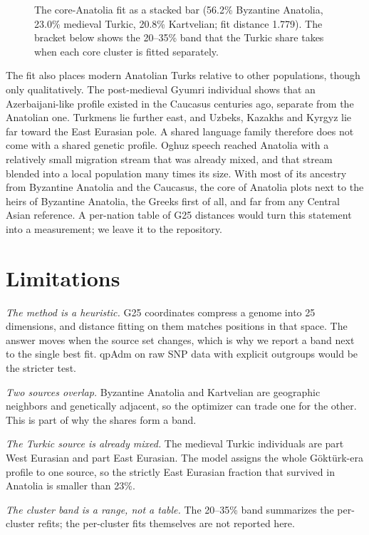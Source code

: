 \documentclass[conference,a4paper]{IEEEtran}
\begin{document}
\begin{figure}[t]
\centering

\caption{The core-Anatolia fit as a stacked bar (56.2\% Byzantine Anatolia, 23.0\% medieval Turkic, 20.8\% Kartvelian; fit distance 1.779). The bracket below shows the 20--35\% band that the Turkic share takes when each core cluster is fitted separately.}
\label{fig:model}
\end{figure}

The fit also places modern Anatolian Turks relative to other populations, though only qualitatively. The post-medieval Gyumri individual shows that an Azerbaijani-like profile existed in the Caucasus centuries ago, separate from the Anatolian one. Turkmens lie further east, and Uzbeks, Kazakhs and Kyrgyz lie far toward the East Eurasian pole. A shared language family therefore does not come with a shared genetic profile. Oghuz speech reached Anatolia with a relatively small migration stream that was already mixed, and that stream blended into a local population many times its size. With most of its ancestry from Byzantine Anatolia and the Caucasus, the core of Anatolia plots next to the heirs of Byzantine Anatolia, the Greeks first of all, and far from any Central Asian reference. A per-nation table of G25 distances would turn this statement into a measurement; we leave it to the repository.

\section{Limitations}\label{sec:limits}
\textit{The method is a heuristic.} G25 coordinates compress a genome into 25 dimensions, and distance fitting on them matches positions in that space. The answer moves when the source set changes, which is why we report a band next to the single best fit. qpAdm on raw SNP data with explicit outgroups would be the stricter test.

\textit{Two sources overlap.} Byzantine Anatolia and Kartvelian are geographic neighbors and genetically adjacent, so the optimizer can trade one for the other. This is part of why the shares form a band.

\textit{The Turkic source is already mixed.} The medieval Turkic individuals are part West Eurasian and part East Eurasian. The model assigns the whole Göktürk-era profile to one source, so the strictly East Eurasian fraction that survived in Anatolia is smaller than 23\%.

\textit{The cluster band is a range, not a table.} The 20--35\% band summarizes the per-cluster refits; the per-cluster fits themselves are not reported here.
\end{document}
